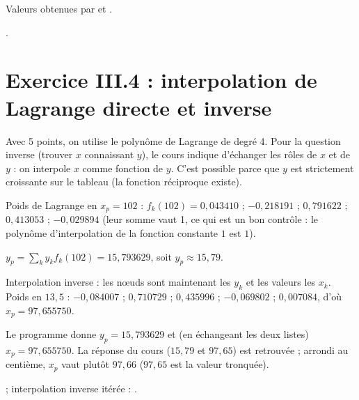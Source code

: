 \Verif Valeurs obtenues par  et .

\Refs {}.

\section{Exercice III.4 : interpolation de Lagrange directe et inverse}


\Pourquoi Avec 5 points, on utilise le polynôme de Lagrange de degré 4. Pour la
question inverse (trouver $x$ connaissant $y$), le cours indique d'échanger les
rôles de $x$ et de $y$ : on interpole $x$ comme fonction de $y$. C'est possible
parce que $y$ est strictement croissante sur le tableau (la fonction réciproque
existe).

\Etapes
{} Poids de Lagrange en $x_p = 102$ :
$f_k(102) = 0{,}043410$ ; $-0{,}218191$ ; $0{,}791622$ ; $0{,}413053$ ;
$-0{,}029894$ (leur somme vaut 1, ce qui est un bon contrôle : le polynôme
d'interpolation de la fonction constante $1$ est $1$).

 $y_p = \sum_k y_kf_k(102) = 15{,}793629$, soit $y_p \approx 15{,}79$.

 Interpolation inverse : les nœuds sont maintenant les $y_k$ et les
valeurs les $x_k$. Poids en $13{,}5$ : $-0{,}084007$ ; $0{,}710729$ ;
$0{,}435996$ ; $-0{,}069802$ ; $0{,}007084$, d'où $x_p = 97{,}655750$.

\Verif Le programme  donne $y_p = 15{,}793629$ et (en
échangeant les deux listes) $x_p = 97{,}655750$. La réponse du cours
($15{,}79$ et $97{,}65$) est retrouvée ; arrondi au centième, $x_p$ vaut
plutôt $97{,}66$ ($97{,}65$ est la valeur tronquée).

\Refs {} ; interpolation inverse itérée : .
